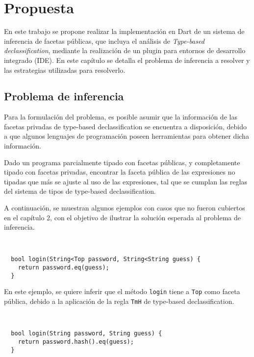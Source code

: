 \chapter{Propuesta}

En este trabajo se propone realizar la implementación en Dart de un sistema de inferencia de facetas públicas, que incluya el análisis de \textit{Type-based declassification}, mediante la realización de un plugin para entornos de desarrollo integrado (IDE). En este capítulo se detalla el problema de inferencia a resolver y las estrategias utilizadas para resolverlo.

\section{Problema de inferencia}
Para la formulación del problema, es posible asumir que la información de las facetas privadas de type-based declassification se encuentra a disposición, debido a que algunos lenguajes de programación poseen herramientas para obtener dicha información.

\begin{defn}
  Dado un programa parcialmente tipado con facetas públicas, y completamente tipado con facetas privadas, encontrar la faceta pública de las expresiones no tipadas que más se ajuste al uso de las expresiones, tal que se cumplan las reglas del sistema de tipos de type-based declassification.
\end{defn}

A continuación, se muestran algunos ejemplos con casos que no fueron cubiertos en el capítulo 2, con el objetivo de ilustrar la solución esperada al problema de inferencia.

\begin{ej} \ \\
  \label{ej-tmh}
  \normalfont
\begin{lstlisting}
  bool login(String<Top password, String<String guess) {
    return password.eq(guess);
  }
\end{lstlisting}
\end{ej}


En este ejemplo, se quiere inferir que el método \texttt{login} tiene a \texttt{Top} como faceta pública, debido a la aplicación de la regla \texttt{TmH} de type-based declassification.

\begin{ej} \ \\
  \normalfont
\begin{lstlisting}
  bool login(String password, String guess) {
    return password.hash().eq(guess);
  }
\end{lstlisting}
\end{ej}

